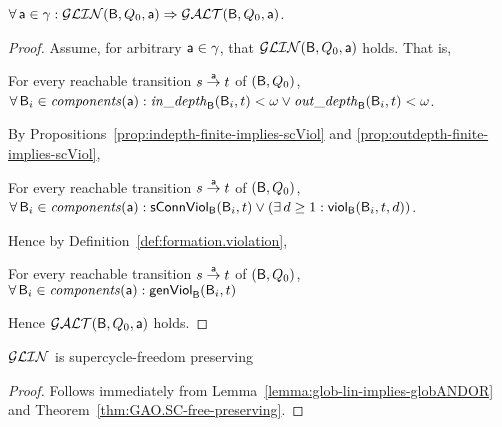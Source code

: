 





\begin{lemma} \label{lemma:glob-lin-implies-globANDOR} \label{GLinGAO}
$\fa \act \in \gamma: \GLin(\B, Q_0, \act) \imp \GAO(\B, Q_0, \act)$.  
\end{lemma}
%
\begin{proof}
Assume, for arbitrary $\act \in \gamma$, that $\GLin(\B, Q_0, \act)$ holds. That is, 
 
\ind For every reachable transition $s \goesto[\act] t$ of $(\B, Q_0)$,\\
\ind \ind  $\fas \B_i \in \cmps{\act}: \widepth{\B}{\B_i}{t} < \omega \lor \wodepth{\B}{\B_i}{t} < \omega$.

\noindent
By Propositions~\ref{prop:indepth-finite-implies-scViol} and \ref{prop:outdepth-finite-implies-scViol}, 

\ind For every reachable transition $s \goesto[\act] t$ of $(\B, Q_0)$,\\
\ind \ind  $\fas \B_i \in \cmps{\act}:  \connViol{\B_i}{t} \lor (\ex d \ge 1: \viol{\B_i}{d}{t})$.

\noindent
Hence by Definition~\ref{def:formation.violation}, 

\ind For every reachable transition $s \goesto[\act] t$ of $(\B, Q_0)$,\\
\ind \ind  $\fas \B_i \in \cmps{\act} : \formViol{\B_i}{t}$

\noindent
Hence $\GAO(\B, Q_0, \act)$ holds.
\end{proof}


\begin{theorem} \label{thm:GLin.SC-free-preserving}
$\GLin$ is supercycle-freedom preserving
\end{theorem}
%
\begin{proof}
Follows immediately from Lemma~\ref{lemma:glob-lin-implies-globANDOR} and Theorem~\ref{thm:GAO.SC-free-preserving}.
\end{proof}


